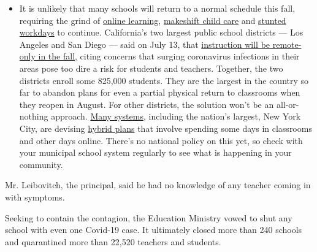\begin{itemize}
  \begin{itemize}
  \tightlist
  \item
    It is unlikely that many schools will return to a normal schedule
    this fall, requiring the grind of
    \href{https://www.nytimes3xbfgragh.onion/2020/06/05/us/coronavirus-education-lost-learning.html?action=click\&pgtype=Article\&state=default\&region=MAIN_CONTENT_3\&context=storylines_faq}{online
    learning},
    \href{https://www.nytimes3xbfgragh.onion/2020/05/29/us/coronavirus-child-care-centers.html?action=click\&pgtype=Article\&state=default\&region=MAIN_CONTENT_3\&context=storylines_faq}{makeshift
    child care} and
    \href{https://www.nytimes3xbfgragh.onion/2020/06/03/business/economy/coronavirus-working-women.html?action=click\&pgtype=Article\&state=default\&region=MAIN_CONTENT_3\&context=storylines_faq}{stunted
    workdays} to continue. California's two largest public school
    districts --- Los Angeles and San Diego --- said on July 13, that
    \href{https://www.nytimes3xbfgragh.onion/2020/07/13/us/lausd-san-diego-school-reopening.html?action=click\&pgtype=Article\&state=default\&region=MAIN_CONTENT_3\&context=storylines_faq}{instruction
    will be remote-only in the fall}, citing concerns that surging
    coronavirus infections in their areas pose too dire a risk for
    students and teachers. Together, the two districts enroll some
    825,000 students. They are the largest in the country so far to
    abandon plans for even a partial physical return to classrooms when
    they reopen in August. For other districts, the solution won't be an
    all-or-nothing approach.
    \href{https://bioethics.jhu.edu/research-and-outreach/projects/eschool-initiative/school-policy-tracker/}{Many
    systems}, including the nation's largest, New York City, are
    devising
    \href{https://www.nytimes3xbfgragh.onion/2020/06/26/us/coronavirus-schools-reopen-fall.html?action=click\&pgtype=Article\&state=default\&region=MAIN_CONTENT_3\&context=storylines_faq}{hybrid
    plans} that involve spending some days in classrooms and other days
    online. There's no national policy on this yet, so check with your
    municipal school system regularly to see what is happening in your
    community.
  \end{itemize}
\end{itemize}

Mr. Leibovitch, the principal, said he had no knowledge of any teacher
coming in with symptoms.

Seeking to contain the contagion, the Education Ministry vowed to shut
any school with even one Covid-19 case. It ultimately closed more than
240 schools and quarantined more than 22,520 teachers and students.

